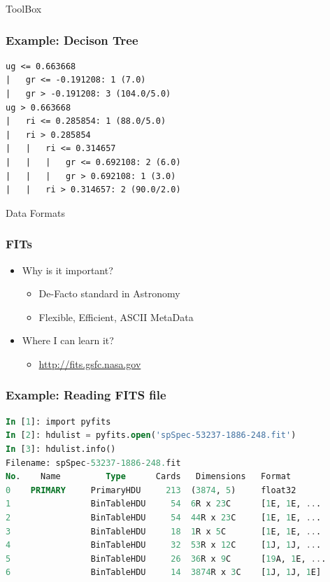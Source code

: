 \documentclass[fleqn]{beamer}
\begin{document}
\begin{section}{ToolBox}
\begin{frame}[containsverbatim]\frametitle{Example: Decison Tree}

\begin{lstlisting}
ug <= 0.663668
|   gr <= -0.191208: 1 (7.0)
|   gr > -0.191208: 3 (104.0/5.0)
ug > 0.663668
|   ri <= 0.285854: 1 (88.0/5.0)
|   ri > 0.285854
|   |   ri <= 0.314657
|   |   |   gr <= 0.692108: 2 (6.0)
|   |   |   gr > 0.692108: 1 (3.0)
|   |   ri > 0.314657: 2 (90.0/2.0)
\end{lstlisting}

\end{frame}


\end{section}


\begin{section}{Data Formats}

  \begin{frame}\frametitle{FITs}
  \begin{itemize}
    \item{Why is it important?}
      \begin{itemize}
      \item De-Facto standard in Astronomy
      \item Flexible, Efficient, ASCII MetaData
      \end{itemize}
    \item{Where I can learn it?}
      \begin{itemize}
      \item \url{http://fits.gsfc.nasa.gov}
      \end{itemize}
  \end{itemize}
  \end{frame}

\begin{frame}[containsverbatim]\frametitle{Example: Reading FITS file}
\begin{lstlisting}[language=SQL]
In [1]: import pyfits
In [2]: hdulist = pyfits.open('spSpec-53237-1886-248.fit')
In [3]: hdulist.info()
Filename: spSpec-53237-1886-248.fit
No.    Name         Type      Cards   Dimensions   Format
0    PRIMARY     PrimaryHDU     213  (3874, 5)     float32
1                BinTableHDU     54  6R x 23C      [1E, 1E, ...
2                BinTableHDU     54  44R x 23C     [1E, 1E, ...
3                BinTableHDU     18  1R x 5C       [1E, 1E, ...
4                BinTableHDU     32  53R x 12C     [1J, 1J, ...
5                BinTableHDU     26  36R x 9C      [19A, 1E, ...
6                BinTableHDU     14  3874R x 3C    [1J, 1J, 1E]
\end{lstlisting}
\end{frame}



\end{section}
\end{document}
